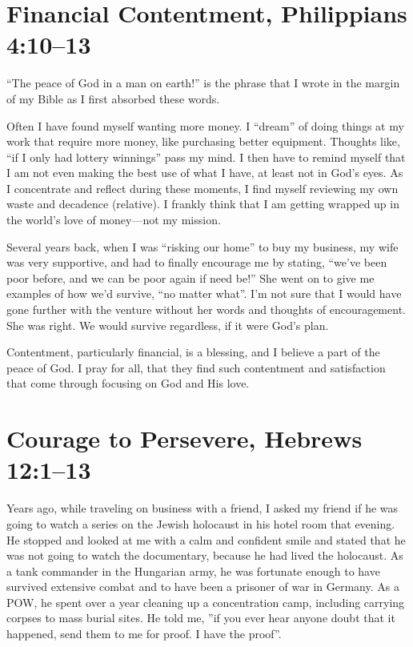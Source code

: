 \documentclass[12pt]{memoir}
\begin{document}
\section[Financial Contentment]{Financial Contentment, Philippians 4:10--13}

``The peace of God in a man on earth!'' is the phrase that I wrote
in the margin of my Bible as I first absorbed these words. 

Often I have found myself wanting more money. I ``dream'' of doing
things at my work that require more money, like purchasing better
equipment. Thoughts like, ``if I only had lottery winnings'' pass
my mind. I then have to remind myself that I am not even making the
best use of what I have, at least not in God's eyes. As I concentrate
and reflect during these moments, I find myself reviewing my own waste
and decadence (relative). I frankly think that I am getting wrapped
up in the world's love of money---not my mission.

Several years back, when I was ``risking our home'' to buy my business,
my wife was very supportive, and had to finally encourage me by stating,
``we've been poor before, and we can be poor again if need be!''
She went on to give me examples of how we'd survive, ``no matter
what''. I'm not sure that I would have gone further with the venture
without her words and thoughts of encouragement. She was right. We
would survive regardless, if it were God's plan.

Contentment, particularly financial, is a blessing, and I believe
a part of the peace of God. I pray for all, that they find such contentment
and satisfaction that come through focusing on God and His love.

\section[Courage to Persevere]{Courage to Persevere, Hebrews 12:1--13}

Years ago, while traveling on business with a friend, I asked my friend if he was going to watch a series on the Jewish holocaust in his hotel room that evening. He stopped and looked at me with a calm and confident smile and stated that he was not going to watch the documentary, because he had lived the holocaust. As a tank commander in the Hungarian army, he was fortunate enough to have survived extensive combat and to have been a prisoner of war in Germany. As a \textsc{POW}, he spent over a year cleaning up a concentration camp, including carrying corpses to mass burial sites. He told me, ''if you ever hear anyone doubt that it happened, send them to me for proof. I have the proof''.
\end{document}
